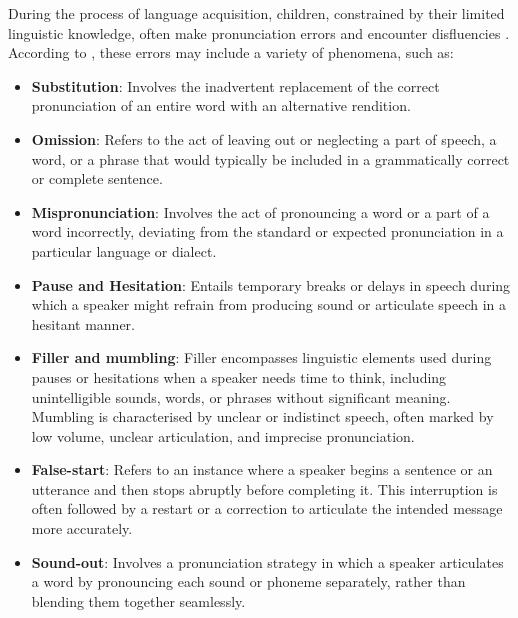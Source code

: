 During the process of language acquisition, children, constrained by their limited linguistic knowledge, often make pronunciation errors and encounter disfluencies \cite{language_children}. According to \cite{clark1977psychology}, these errors may include a variety of phenomena, such as:
\begin{itemize}
    \item \textbf{Substitution}:  Involves the inadvertent replacement of the correct pronunciation of an entire word with an alternative rendition.
    \item \textbf{Omission}:  Refers to the act of leaving out or neglecting a part of speech, a word, or a phrase that would typically be included in a grammatically correct or complete sentence.
    \item \textbf{Mispronunciation}:  Involves the act of pronouncing a word or a part of a word incorrectly, deviating from the standard or expected pronunciation in a particular language or dialect.
    \item \textbf{Pause and Hesitation}: Entails temporary breaks or delays in speech during which a speaker might refrain from producing sound or articulate speech in a hesitant manner.
    \item \textbf{Filler and mumbling}:  Filler encompasses linguistic elements used during pauses or hesitations when a speaker needs time to think, including unintelligible sounds, words, or phrases without significant meaning. Mumbling is characterised by unclear or indistinct speech, often marked by low volume, unclear articulation, and imprecise pronunciation.
    \item \textbf{False-start}:  Refers to an instance where a speaker begins a sentence or an utterance and then stops abruptly before completing it. This interruption is often followed by a restart or a correction to articulate the intended message more accurately.
    \item \textbf{Sound-out}: Involves a pronunciation strategy in which a speaker articulates a word by pronouncing each sound or phoneme separately, rather than blending them together seamlessly.
\end{itemize}

